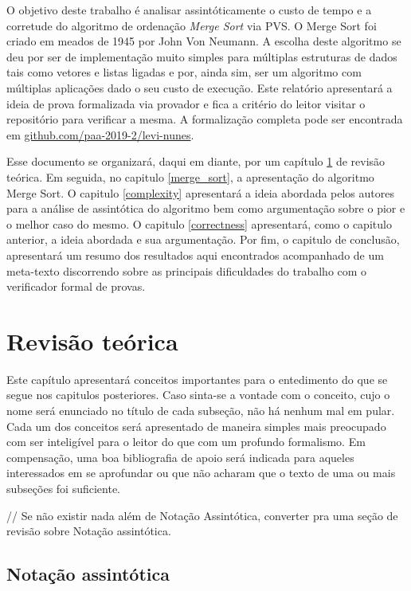 \documentclass[12pt]{article}
\begin{document}
O objetivo deste trabalho é analisar assintóticamente o custo de tempo e a corretude do algoritmo de ordenação \textit{Merge Sort} via PVS. O Merge Sort foi criado
em meados de 1945 por John Von Neumann. A escolha deste algoritmo se deu por ser de implementação muito simples para múltiplas estruturas de dados tais como
vetores e listas ligadas e por, ainda sim, ser um algoritmo com múltiplas aplicações dado o seu custo de execução. Este relatório apresentará a ideia de prova
formalizada via provador e fica a critério do leitor visitar o repositório para verificar a mesma. A formalização completa pode ser encontrada em \url{github.com/paa-2019-2/levi-nunes}.

Esse documento se organizará, daqui em diante, por um capítulo \ref{explaining} de revisão teórica. Em seguida, no capitulo \ref{merge_sort}, a apresentação do algoritmo Merge Sort. 
O capitulo \ref{complexity} apresentará a ideia abordada pelos autores para a análise de assintótica do algoritmo
bem como argumentação sobre o pior e o melhor caso do mesmo. O capitulo \ref{correctness} apresentará, como o capitulo anterior, a ideia abordada
e sua argumentação. Por fim, o capitulo de conclusão, apresentará um resumo dos resultados aqui encontrados acompanhado de um meta-texto discorrendo sobre
as principais dificuldades do trabalho com o verificador formal de provas.

\section{Revisão teórica}
\label{explaining}

Este capítulo apresentará conceitos importantes para o entedimento do que se segue nos capitulos posteriores. Caso sinta-se a vontade com o conceito, 
cujo o nome será enunciado no título de cada subseção, não há nenhum mal em pular. Cada um dos conceitos será apresentado de maneira simples mais preocupado
com ser inteligível para o leitor do que com um profundo formalismo. Em compensação, uma boa bibliografia de apoio será indicada para aqueles interessados em 
se aprofundar ou que não acharam que o texto de uma ou mais subseções foi suficiente.

// Se não existir nada além de Notação Assintótica, converter pra uma seção de revisão sobre Notação assintótica.
\subsection{Notação assintótica}
\end{document}
